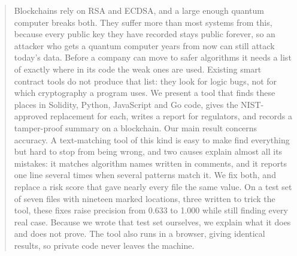 \documentclass[runningheads]{llncs}
\begin{document}
\author{Benidict David}



\maketitle

\begin{abstract}
Blockchains rely on RSA and ECDSA, and a large enough quantum computer breaks
both. They suffer more than most systems from this, because every public key
they have recorded stays public forever, so an attacker who gets a quantum
computer years from now can still attack today's data. Before a company can move
to safer algorithms it needs a list of exactly where in its code the weak ones
are used. Existing smart contract tools do not produce that list: they look for
logic bugs, not for which cryptography a program uses. We present a tool that
finds these places in Solidity, Python, JavaScript and Go code, gives the
NIST-approved replacement for each, writes a report for regulators, and records
a tamper-proof summary on a blockchain. Our main result concerns
accuracy. A text-matching tool of this kind is easy to make find everything but
hard to stop from being wrong, and two causes explain almost all its mistakes:
it matches algorithm names written in comments, and it reports one line several
times when several patterns match it. We fix both, and replace a risk score that
gave nearly every file the same value. On a test set of seven files with
nineteen marked locations, three written to trick the tool, these fixes raise
precision from 0.633 to 1.000 while still finding every real case. Because we
wrote that test set ourselves, we explain what it does and does not prove. The
tool also runs in a browser, giving identical results, so private code never
leaves the machine.

\end{abstract}

\end{document}
